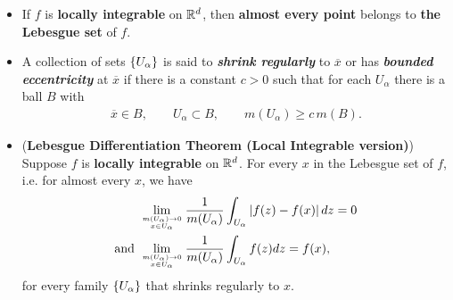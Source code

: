 \documentclass[11pt]{article}
\begin{document}
\begin{itemize}
\item \begin{corollary}
If $f$ is \textbf{locally integrable} on ${\mathbb R}^{d}$, then \textbf{almost every point} belongs to\textbf{ the Lebesgue set} of $f$. 
\end{corollary}

\item \begin{definition}
A collection of sets $\left\{U_{\alpha}\right\}$ is said to \emph{\textbf{shrink regularly}} to $\overline{x}$ or has \emph{\textbf{bounded eccentricity}} at $\overline{x}$ if there is a constant $c>0$ such that for each $U_{\alpha}$ there is a ball $B$ with 
\begin{align*}
\overline{x}\in B, \qquad U_{\alpha} \subset B,  \qquad m(U_{\alpha}) \ge c\,m(B). 
\end{align*}
\end{definition}

\item \begin{theorem}(\textbf{Lebesgue Differentiation Theorem (Local Integrable version)}) \citep{stein2009real, folland2013real}\\
Suppose $f$ is \textbf{locally integrable} on ${\mathbb R}^{d}$. For every $x$ in the Lebesgue set of $f$, i.e. for almost every $x$, we have 
\begin{align*}
&\lim\limits_{m(U_{\alpha})\rightarrow 0\atop x\in U_{\alpha}}\frac{1}{m(U_{\alpha})}\int_{U_{\alpha}}\left\lvert f(z) - f(x) \right\rvert dz = 0\\
\text{and }&\lim\limits_{m(U_{\alpha})\rightarrow 0\atop x\in U_{\alpha}}\frac{1}{m(U_{\alpha})}\int_{U_{\alpha}}f(z) dz = f(x),
\end{align*}
for every family $\left\{U_{\alpha}\right\}$ that shrinks regularly to $x$.
\end{theorem}
\end{itemize}
\end{document}
